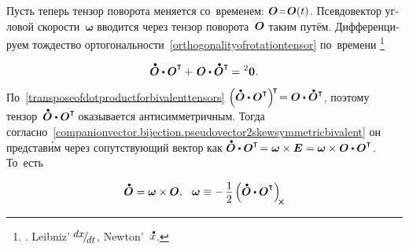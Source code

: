 \begin{otherlanguage}{russian}
Пусть теперь тензор поворота меняется со~временем:
${\rotationtensor \narroweq \rotationtensor(t)}$.
Псевдовектор угловой скорости~${\bm{\omega}}$ вводится через тензор поворота~$\bm{O}$ таким путём.
Дифференцируем тождество ортогональности~\eqref{orthogonalityofrotationtensor} по~времени%
\footnote{ .
  Leibniz’ ${\scalebox{.9}{$ \raisemath{.3em}{dx} $} \hspace{-0.3ex} / \hspace{-0.4ex} \scalebox{.9}{$ \raisemath{-.3em}{dt} $}\hspace{.1ex}}$,   Newton’~${\mathdotabove{x}}$.}

\nopagebreak\vspace{-0.1em}\begin{equation*}
\mathdotabove{\rotationtensor} \dotp \rotationtensor^{\T} \hspace{-0.1ex} + \hspace{.25ex} \rotationtensor \dotp \mathdotabove{\rotationtensor}^{\T} \hspace{-0.1ex} = \hspace{.1ex} \zerobivalent
\hspace{.1ex} .
\end{equation*}

По~\eqref{transposeofdotproductforbivalenttensors}
${\left({ \mathdotabove{\rotationtensor} \dotp \rotationtensor^{\T} }\right)^{\raisemath{-0.25em}{\!\T}} \hspace{-0.4ex} = \rotationtensor \dotp \mathdotabove{\rotationtensor}^{\T}}$,
поэтому
тензор~${\mathdotabove{\rotationtensor} \dotp \rotationtensor^{\T\!}}$
оказывается анти\-сим\-метрич\-ным.
Тогда
согласно~\eqref{companionvector.bijection.pseudovector2skewsymmetricbivalent}
он представ\'{и}м
через сопутствующий вектор
как
${\mathdotabove{\rotationtensor} \dotp \rotationtensor^{\T\!} = \bm{\omega} \times \UnitDyad = \bm{\omega} \times \rotationtensor \dotp \rotationtensor^{\T}}$\!.
То~есть

\nopagebreak\vspace{-0.1em}
\begin{equation}\label{angularvelocityvector}
\mathdotabove{\rotationtensor} = \bm{\omega} \times \rotationtensor, \;\:\:
\bm{\omega} \equiv -\, \displaystyle \onehalf \left( \mathdotabove{\rotationtensor} \dotp \rotationtensor^{\T} \right)_{\hspace{-0.2em}\Xcompanion}
\vspace{-0.25em}\end{equation}


\end{otherlanguage}
